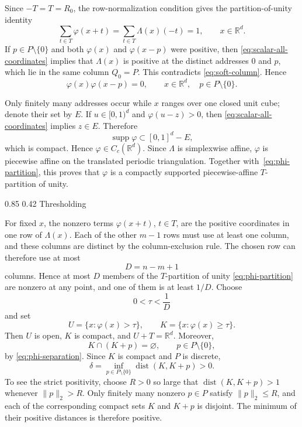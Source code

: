 \documentclass[11pt,reqno]{amsart}
\makeatletter
\numberwithin{equation}{section}
\renewcommand\subsection{\@startsection{subsection}{2}{\z@}%
  {0.85\baselineskip \@plus 0.25\baselineskip \@minus 0.10\baselineskip}%
  {0.42\baselineskip}%
  {\normalfont\bfseries}}
\theoremstyle{definition}
\theoremstyle{remark}
\newcommand{\R}{\mathbb R}
\newcommand{\dist}{\operatorname{dist}}
\newcommand{\supp}{\operatorname{supp}}
\newcommand{\norm}[1]{\lVert #1\rVert}
\makeatother
\begin{document}
Since $-T=T=R_0$, the row-normalization condition gives the
partition-of-unity identity
\begin{equation}\label{eq:phi-partition}
 \sum_{t\in T}\varphi(x+t)
 =\sum_{t\in T}\Lambda(x)(-t)=1,
 \qquad x\in\R^d.
\end{equation}
If $p\in P\setminus\{0\}$ and both $\varphi(x)$ and $\varphi(x-p)$ were
positive, then \eqref{eq:scalar-all-coordinates} implies that $\Lambda(x)$ is
positive at the distinct addresses $0$ and $p$, which lie in the same column
$Q_0=P$.  This contradicts \eqref{eq:soft-column}.  Hence
\begin{equation}\label{eq:phi-separation}
 \varphi(x)\varphi(x-p)=0,
 \qquad x\in\R^d,
 \quad p\in P\setminus\{0\}.
\end{equation}

Only finitely many addresses occur while $x$ ranges over one closed unit
cube; denote their set by $E$.  If $u\in[0,1)^d$ and
$\varphi(u-z)>0$, then \eqref{eq:scalar-all-coordinates} implies $z\in E$.
Therefore
\[
 \supp\varphi\subset[0,1]^d-E,
\]
which is compact.  Hence $\varphi\in C_c(\R^d)$.  Since $\Lambda$ is simplexwise affine,
$\varphi$ is piecewise affine on the translated periodic triangulation.
Together with~\eqref{eq:phi-partition}, this proves that $\varphi$ is a
compactly supported piecewise-affine $T$-partition of unity.

\subsection{Thresholding}

For fixed $x$, the nonzero terms $\varphi(x+t)$, $t\in T$, are the positive
coordinates in one row of $\Lambda(x)$.  Each of the other $m-1$ rows must
use at least one column, and these columns are distinct by the
column-exclusion rule.  The chosen row can therefore use at most
\[
 D=n-m+1
\]
columns.  Hence at most $D$ members of the $T$-partition of unity
\eqref{eq:phi-partition} are nonzero at any point, and one of them is at
least $1/D$.
Choose
\[
 0<\tau<\frac1D
\]
and set
\[
 U=\{x:\varphi(x)>\tau\},
 \qquad
 K=\{x:\varphi(x)\ge\tau\}.
\]
Then $U$ is open, $K$ is compact, and $U+T=\R^d$.  Moreover,
\[
 K\cap(K+p)=\varnothing,
 \qquad p\in P\setminus\{0\},
\]
by \eqref{eq:phi-separation}.  Since $K$ is compact and $P$ is discrete,
\begin{equation}\label{eq:positive-K-separation}
 \delta=
 \inf_{p\in P\setminus\{0\}}\dist(K,K+p)>0.
\end{equation}
To see the strict positivity, choose $R>0$ so large that
$\dist(K,K+p)>1$ whenever $\norm{p}_2>R$.  Only finitely many nonzero
$p\in P$ satisfy $\norm{p}_2\le R$, and each of the corresponding compact
sets $K$ and $K+p$ is disjoint.  The minimum of their positive distances is
therefore positive.
\end{document}
